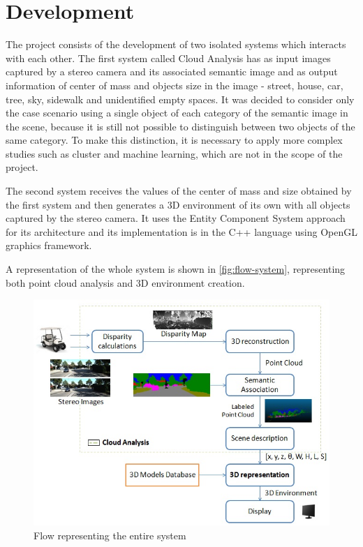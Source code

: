 
\chapter{Development}\label{development}

    The project consists of the development of two isolated systems which interacts with each other. The first system called Cloud Analysis has as input images captured by a stereo camera and its associated semantic image and as output information of center of mass and objects size in the image - street, house, car, tree, sky, sidewalk and unidentified empty spaces. It was decided to consider only the case scenario using a single object of each category of the semantic image in the scene, because it is still not possible to distinguish between two objects of the same category. To make this distinction, it is necessary to apply more complex studies such as cluster and machine learning, which are not in the scope of the project.

    The second system receives the values of the center of mass and size obtained by the first system and then generates a 3D environment of its own with all objects captured by the stereo camera. It uses the Entity Component System approach for its architecture and its implementation is in the C++ language using OpenGL graphics framework.
    
    A representation of the whole system is shown in \autoref{fig:flow-system}, representing both point cloud analysis and 3D environment creation.
    
    \begin{figure}[H]
        \caption{
        \label{fig:flow-system}
            Flow representing the entire system
        }
        \begin{center}
        \includegraphics[width=1\textwidth]{images/fluxo1.png}
        \end{center}
    \end{figure}    

